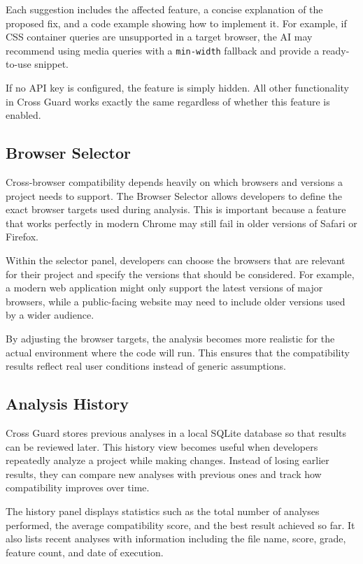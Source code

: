 Each suggestion includes the affected feature, a concise explanation of the proposed fix, and a code example showing how to implement it. For example, if CSS container queries are unsupported in a target browser, the AI may recommend using media queries with a \texttt{min-width} fallback and provide a ready-to-use snippet.

If no API key is configured, the feature is simply hidden. All other functionality in Cross Guard works exactly the same regardless of whether this feature is enabled.

\subsection{Browser Selector}

Cross-browser compatibility depends heavily on which browsers and versions a project needs to support. The Browser Selector allows developers to define the exact browser targets used during analysis. This is important because a feature that works perfectly in modern Chrome may still fail in older versions of Safari or Firefox.

Within the selector panel, developers can choose the browsers that are relevant for their project and specify the versions that should be considered. For example, a modern web application might only support the latest versions of major browsers, while a public-facing website may need to include older versions used by a wider audience.

By adjusting the browser targets, the analysis becomes more realistic for the actual environment where the code will run. This ensures that the compatibility results reflect real user conditions instead of generic assumptions.

\subsection{Analysis History}

Cross Guard stores previous analyses in a local SQLite database so that results can be reviewed later. This history view becomes useful when developers repeatedly analyze a project while making changes. Instead of losing earlier results, they can compare new analyses with previous ones and track how compatibility improves over time.

The history panel displays statistics such as the total number of analyses performed, the average compatibility score, and the best result achieved so far. It also lists recent analyses with information including the file name, score, grade, feature count, and date of execution.

